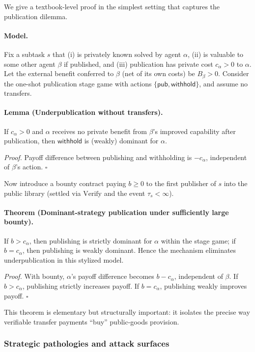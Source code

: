 We give a textbook-level proof in the simplest setting that captures the publication dilemma.

\paragraph{Model.}
Fix a subtask \(s\) that (i) is privately known solved by agent \(\alpha\), (ii) is valuable to some other agent \(\beta\) if published, and (iii) publication has private cost \(c_\alpha>0\) to \(\alpha\). Let the external benefit conferred to \(\beta\) (net of its own costs) be \(B_\beta>0\). Consider the one-shot publication stage game with actions \(\{\mathsf{pub},\mathsf{withhold}\}\), and assume no transfers.

\paragraph{Lemma (Underpublication without transfers).}
If \(c_\alpha>0\) and \(\alpha\) receives no private benefit from \(\beta\)'s improved capability after publication, then \(\mathsf{withhold}\) is (weakly) dominant for \(\alpha\).

\emph{Proof.} Payoff difference between publishing and withholding is \(-c_\alpha\), independent of \(\beta\)'s action. \(\square\)

Now introduce a bounty contract paying \(b\ge 0\) to the first publisher of \(s\) into the public library (settled via \(\mathrm{Verify}\) and the event \(\tau_s<\infty\)).

\paragraph{Theorem (Dominant-strategy publication under sufficiently large bounty).}
If \(b>c_\alpha\), then publishing is strictly dominant for \(\alpha\) within the stage game; if \(b=c_\alpha\), then publishing is weakly dominant. Hence the mechanism eliminates underpublication in this stylized model.

\emph{Proof.} With bounty, \(\alpha\)'s payoff difference becomes \(b-c_\alpha\), independent of \(\beta\). If \(b>c_\alpha\), publishing strictly increases payoff. If \(b=c_\alpha\), publishing weakly improves payoff. \(\square\)

This theorem is elementary but structurally important: it isolates the precise way verifiable transfer payments ``buy'' public-goods provision.

\subsubsection{Strategic pathologies and attack surfaces}

